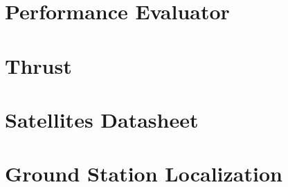\section{Performance Evaluator}
\label{PerformanceEvaluator}


\section{Thrust}
\label{Thrust}



\section{Satellites Datasheet}
\label{SatsDatashhet}


\section{Ground Station Localization}
\label{GSLocalization}



%
